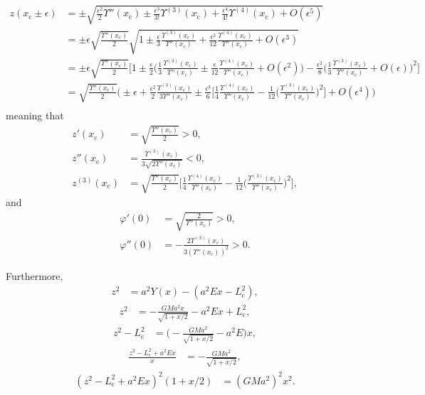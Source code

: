 \documentclass[11pt]{article}
\newcommand{\rc}{\mathrm{c}}
\newcommand{\Lc}{L_{\rc}}
\newcommand{\xc}{x_{\rc}}
\begin{document}
\begin{appendices}
\begin{align*}
  z(\xc\pm\epsilon) &= \pm \sqrt{\frac{\epsilon^{2}}{2}\Upsilon''(\xc) \pm \frac{\epsilon^{3}}{3!}\Upsilon^{(3)}(\xc)+\frac{\epsilon^{4}}{4!}\Upsilon^{(4)}(\xc)+O(\epsilon^{5})} \\
  {}&= \pm \epsilon \sqrt{\frac{\Upsilon''(\xc)}{2}} \sqrt{1 \pm \frac{\epsilon}{3}\frac{\Upsilon^{(3)}(\xc)}{\Upsilon''(\xc)}+\frac{\epsilon^{2}}{12}\frac{\Upsilon^{(4)}(\xc)}{\Upsilon''(\xc)}+O(\epsilon^{3})} \\
  {}&= \pm \epsilon \sqrt{\frac{\Upsilon''(\xc)}{2}} \bigg[1 \pm \frac{\epsilon}{2}\bigg(\frac{1}{3}\frac{\Upsilon^{(3)}(\xc)}{\Upsilon''(\xc)}\pm\frac{\epsilon}{12}\frac{\Upsilon^{(4)}(\xc)}{\Upsilon''(\xc)}+O(\epsilon^{2})\bigg) -\frac{\epsilon^{2}}{8}\bigg(\frac{1}{3}\frac{\Upsilon^{(3)}(\xc)}{\Upsilon''(\xc)}+O(\epsilon)\bigg)^{2}\bigg] \\
  {}&=  \sqrt{\frac{\Upsilon''(\xc)}{2}} \bigg(\pm \epsilon+\frac{\epsilon^{2}}{2}\frac{\Upsilon^{(3)}(\xc)}{3\Upsilon''(\xc)}\pm\frac{\epsilon^{3}}{6}\bigg[\frac{1}{4}\frac{\Upsilon^{(4)}(\xc)}{\Upsilon''(\xc)} -\frac{1}{12}\bigg(\frac{\Upsilon^{(3)}(\xc)}{\Upsilon''(\xc)}\bigg)^{2}\bigg] +O(\epsilon^{4})\bigg) \\
\end{align*}
meaning that
\begin{align*}
  z'(\xc) &= \sqrt{\frac{\Upsilon''(\xc)}{2}} > 0,\\
  z''(\xc) &= \frac{\Upsilon^{(3)}(\xc)}{3\sqrt{2\Upsilon''(\xc)}} < 0,\\
  z^{(3)}(\xc) &=  \sqrt{\frac{\Upsilon''(\xc)}{2}}\bigg[\frac{1}{4}\frac{\Upsilon^{(4)}(\xc)}{\Upsilon''(\xc)} -\frac{1}{12}\bigg(\frac{\Upsilon^{(3)}(\xc)}{\Upsilon''(\xc)}\bigg)^{2}\bigg] ,
\end{align*}
and
\begin{align*}
  \varphi'(0) &= \sqrt{\frac{2}{\Upsilon''(\xc)}} > 0,\\
  \varphi''(0) &= -\frac{2\Upsilon^{(3)}(\xc)}{3(\Upsilon''(\xc))^{2}} > 0.
\end{align*}

Furthermore,
\begin{align*}
  z^{2} &= a^{2}Y(x) - (a^{2}E x-\Lc^{2})  ,
\end{align*}
\begin{align*}
  z^{2} &= -\frac{GMa^{2}x}{\sqrt{1+x/2}}-a^{2}E x + \Lc^{2} ,
\end{align*}
\begin{align*}
 z^{2}-\Lc^{2} &= \bigg(-\frac{GMa^{2}}{\sqrt{1+x/2}}-a^{2}E\bigg)x ,
  \end{align*}
\begin{align*}
\frac{z^{2}-\Lc^{2}+a^{2}E x}{x} &= -\frac{GMa^{2}}{\sqrt{1+x/2}} ,
  \end{align*}
\begin{align*}
(z^{2}-\Lc^{2}+a^{2}E x)^{2}(1+x/2) &=(GMa^{2})^{2}x^{2} .
  \end{align*}


\end{appendices}
\end{document}
